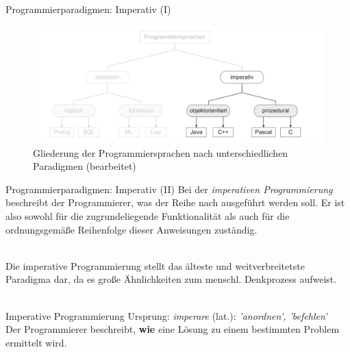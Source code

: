             \begin{frame}{Programmierparadigmen: Imperativ (I)}
                \begin{figure}
                    \centering
                    \includegraphics[width=\linewidth,height=0.5\textheight,keepaspectratio]{chapters/04_programming_languages/figures/paradigms/imperative.png}
                    \caption{Gliederung der Programmiersprachen nach unterschiedlichen Paradigmen \cite{Muller2015} (bearbeitet)}
                \end{figure}   
            \end{frame}
            
            \begin{frame}{Programmierparadigmen: Imperativ (II)}
                Bei der \textit{imperativen Programmierung} beschreibt der Programmierer, was der Reihe nach ausgeführt werden soll. Er ist also sowohl für die zugrundeliegende Funktionalität als auch für die ordnungsgemäße Reihenfolge dieser Anweisungen zuständig. \\~\
                
                Die imperative Programmierung stellt das älteste und weitverbreitetste Paradigma dar, da es große Ähnlichkeiten zum menschl. Denkprozess aufweist.\\~\
                
                \begin{block}{Imperative Programmierung}
                    Ursprung: \textit{imperare} (lat.): \textit{'anordnen', 'befehlen'} \\
                    Der Programmierer beschreibt, \textbf{wie} eine Lösung zu einem bestimmten Problem ermittelt wird.
               \end{block}
               
            \end{frame}
            

